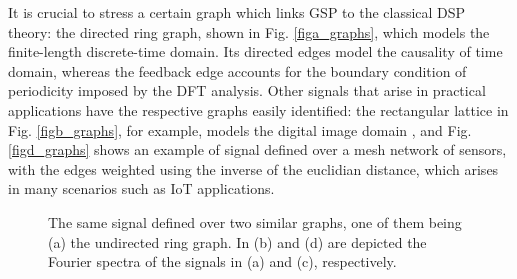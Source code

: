 It is crucial to stress a certain graph which links GSP to the classical DSP theory: the directed ring graph, shown in Fig. \ref{figa_graphs}, which models the finite-length discrete-time domain. Its directed edges model the causality of time domain, whereas the feedback edge accounts for the boundary condition of periodicity imposed by the DFT analysis. Other signals that arise in practical applications have the respective graphs easily identified: the rectangular lattice in Fig. \ref{figb_graphs}, for example, models the digital image domain \cite{sandryhaila2012nearest}, and Fig. \ref{figd_graphs} shows an example of signal defined over a mesh network of sensors, with the edges weighted using the inverse of the euclidian distance, which arises in many scenarios such as IoT applications.

\begin{figure}
	\centering
    \caption{The same signal defined over two similar graphs, one of them being (a) the undirected ring graph. In (b) and (d) are depicted the Fourier spectra of the signals in (a) and (c), respectively.}%
	\begin{minipage}[c]{0.24\linewidth}
	\end{minipage} %
	\begin{minipage}[c]{0.24\linewidth}
		\subfloat[\label{fig:diff_struct_c}]{
}
\end{minipage}
\end{figure}
